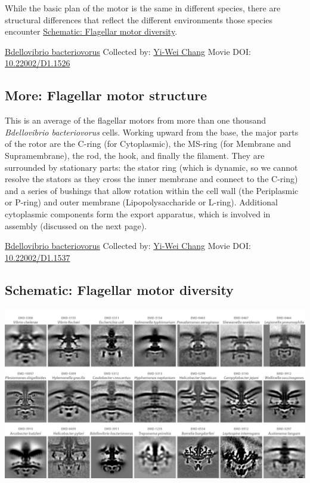 \documentclass[]{tufte-book}
\begin{document}
While the basic plan of the motor is the same in different species, there are structural differences that reflect the different environments those species encounter \protect\hyperlink{Flagellar_motor_diversity}{Schematic: Flagellar motor diversity}.



\hypertarget{htmlwidget-16e0d57f36e45bf3783b}{}

\label{fig:6-2}\protect\hyperlink{tree}{Bdellovibrio bacteriovorus} Collected by: \protect\hyperlink{yi-wei_chang}{Yi-Wei Chang} Movie DOI: \href{https://doi.org/10.22002/D1.1526}{10.22002/D1.1526}

\hypertarget{Flagellar_motor_structure}{%
\subsection*{More: Flagellar motor structure}\label{Flagellar_motor_structure}}

This is an average of the flagellar motors from more than one thousand \emph{Bdellovibrio bacteriovorus} cells. Working upward from the base, the major parts of the rotor are the C-ring (for Cytoplasmic), the MS-ring (for Membrane and Supramembrane), the rod, the hook, and finally the filament. They are surrounded by stationary parts: the stator ring (which is dynamic, so we cannot resolve the stators as they cross the inner membrane and connect to the C-ring) and a series of bushings that allow rotation within the cell wall (the Periplasmic or P-ring) and outer membrane (Lipopolysaccharide or L-ring). Additional cytoplasmic components form the export apparatus, which is involved in assembly (discussed on the next page).



\hypertarget{htmlwidget-312382c8f96b8577bfb0}{}

\label{fig:6-2a}\protect\hyperlink{tree}{Bdellovibrio bacteriovorus} Collected by: \protect\hyperlink{yi-wei_chang}{Yi-Wei Chang} Movie DOI: \href{https://doi.org/10.22002/D1.1537}{10.22002/D1.1537}

\hypertarget{Flagellar_motor_diversity}{%
\subsection*{Schematic: Flagellar motor diversity}\label{Flagellar_motor_diversity}}

\includegraphics{img/schematics/6_2_1}
\end{document}

